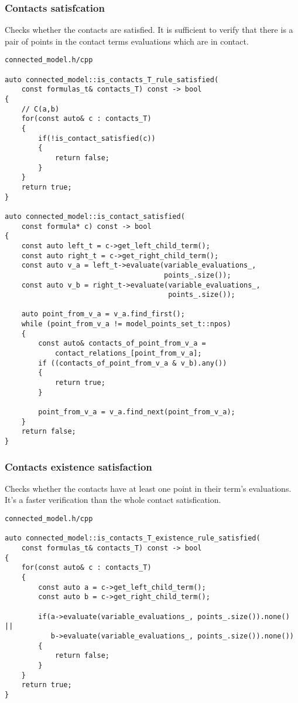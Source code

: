 \documentclass{article}
\begin{document}
	\subsubsection*{Contacts satisfcation}
	Checks whether the contacts are satisfied. It is sufficient to verify that there is a pair of points in the contact terms evaluations which are in contact.
\\
\begin{lstlisting}
connected_model.h/cpp

auto connected_model::is_contacts_T_rule_satisfied(
	const formulas_t& contacts_T) const -> bool
{
    // C(a,b)
    for(const auto& c : contacts_T)
    {
        if(!is_contact_satisfied(c))
        {
            return false;
        }
    }
    return true;
}

auto connected_model::is_contact_satisfied(
	const formula* c) const -> bool
{
    const auto left_t = c->get_left_child_term();
    const auto right_t = c->get_right_child_term();
    const auto v_a = left_t->evaluate(variable_evaluations_,
                                      points_.size());
    const auto v_b = right_t->evaluate(variable_evaluations_,
                                       points_.size());

    auto point_from_v_a = v_a.find_first();
    while (point_from_v_a != model_points_set_t::npos)
    {
        const auto& contacts_of_point_from_v_a =
            contact_relations_[point_from_v_a];
        if ((contacts_of_point_from_v_a & v_b).any())
        {
            return true;
        }

        point_from_v_a = v_a.find_next(point_from_v_a);
    }
    return false;
}
\end{lstlisting}

	\newpage
	\subsubsection*{Contacts existence satisfaction}
	Checks whether the contacts have at least one point in their term's evaluations. It's a faster verification than the whole contact satisfication.
\\
\begin{lstlisting}
connected_model.h/cpp

auto connected_model::is_contacts_T_existence_rule_satisfied(
	const formulas_t& contacts_T) const -> bool
{
    for(const auto& c : contacts_T)
    {
        const auto a = c->get_left_child_term();
        const auto b = c->get_right_child_term();

        if(a->evaluate(variable_evaluations_, points_.size()).none() ||
           b->evaluate(variable_evaluations_, points_.size()).none())
        {
            return false;
        }
    }
    return true;
}
\end{lstlisting}
\end{document}
